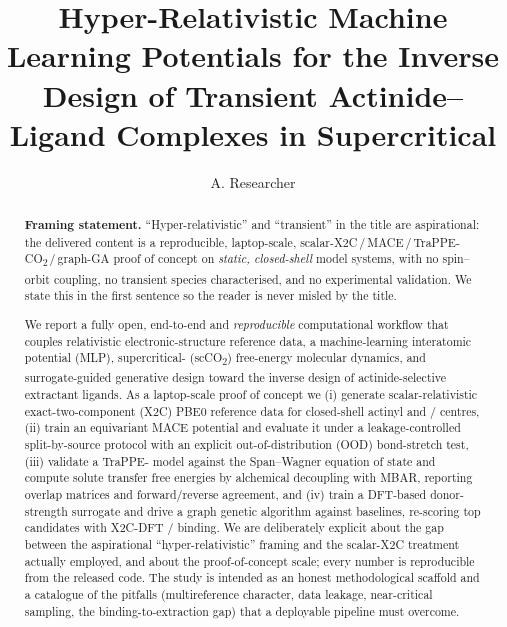 \documentclass[journal=jcisd8,manuscript=article]{achemso}
\author{A. Researcher}
\affiliation{Computational demonstration; see Data and Software Availability.}
\title{Hyper-Relativistic Machine Learning Potentials for the Inverse Design of
Transient Actinide--Ligand Complexes in Supercritical \ce{CO2}}
\begin{document}
\begin{abstract}
\textbf{Framing statement.} ``Hyper-relativistic'' and ``transient'' in the title
are aspirational: the delivered content is a reproducible, laptop-scale,
scalar-X2C\,/\,MACE\,/\,TraPPE-CO\textsubscript{2}\,/\,graph-GA proof of concept on
\emph{static, closed-shell}  model systems, with no spin--orbit coupling, no
transient species characterised, and no experimental validation. We state this in
the first sentence so the reader is never misled by the title.

We report a fully open, end-to-end and \emph{reproducible} computational workflow
that couples relativistic electronic-structure reference data, a machine-learning
interatomic potential (MLP), supercritical- (scCO\textsubscript{2})
free-energy molecular dynamics, and surrogate-guided generative design toward the
inverse design of actinide-selective extractant ligands. As a laptop-scale
proof of concept we (i) generate scalar-relativistic exact-two-component (X2C)
PBE0 reference data for closed-shell  actinyl and / centres,
(ii) train an equivariant MACE potential and evaluate it under a leakage-controlled
split-by-source protocol with an explicit out-of-distribution (OOD) bond-stretch
test, (iii) validate a TraPPE- model against the Span--Wagner equation of
state and compute solute transfer free energies by alchemical decoupling with MBAR,
reporting overlap matrices and forward/reverse agreement, and (iv) train a DFT-based
donor-strength surrogate and drive a graph genetic algorithm against baselines,
re-scoring top candidates with X2C-DFT / binding. We are
deliberately explicit about the gap between the aspirational ``hyper-relativistic''
framing and the scalar-X2C treatment actually employed, and about the
proof-of-concept scale; every number is reproducible from the released code. The
study is intended as an honest methodological scaffold and a catalogue of the
pitfalls (multireference character, data leakage, near-critical sampling, the
binding-to-extraction gap) that a deployable pipeline must overcome.
\end{abstract}
\end{document}
